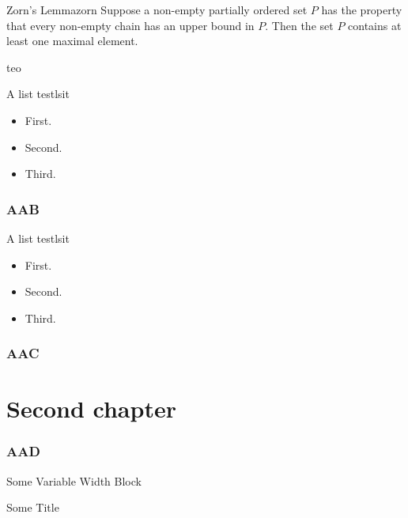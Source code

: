 \documentclass[twoside]{libro-matua}
\begin{document}
\begin{lema}{Zorn's Lemma}{zorn}
Suppose a non-empty partially ordered set $P$ has the property that every non-empty chain has an upper bound in $P$. Then the set $P$ contains at least one maximal element.
\end{lema}
\begin{teorema}{}{teo}
\lipsum[2]
\end{teorema}
\begin{lema}{A list test}{lsit}
\begin{itemize}
\item First.
\item Second.
\item Third.
\end{itemize}
\end{lema}

\subsection{AAB}
\lipsum
\begin{lema}{A list test}{lsit}
\begin{itemize}
\item First.
\item Second.
\item Third.
\end{itemize}
\end{lema}
\subsection{AAC}
\begin{nota}
\lipsum
\end{nota}
\lipsum[4]
\chapter{Second chapter}
\PartialToc
\subsection{AAD}
\begin{MyBlock}{Some Variable Width Block}
\lipsum[4]
\end{MyBlock}

\begin{MyBlock}[.5\linewidth]{Some Title}
\lipsum[4]
\end{MyBlock}
\lipsum
\end{document}
